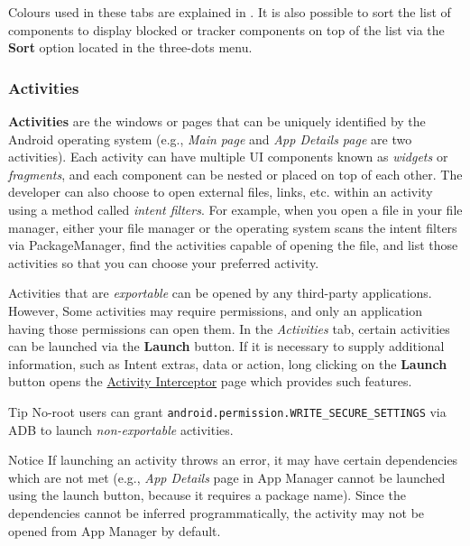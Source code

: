 Colours used in these tabs are explained in . It is also
possible to sort the list of components to display blocked or tracker components on top of the list
via the \textbf{Sort} option located in the three-dots menu.

\subsubsection{Activities}\label{subsubsec:activities} %
\textbf{Activities} are the windows or pages that can be uniquely identified by the Android operating system (e.g.,
\textit{Main page} and \textit{App Details page} are two activities). Each activity can have multiple UI components
known as \textit{widgets} or \textit{fragments}, and each component can be nested or placed on top of each other. The
developer can also choose to open external files, links, etc. within an activity using a method called
\textit{intent filters}. For example, when you open a file in your file manager, either your file manager or the
operating system scans the intent filters via PackageManager, find the activities capable of opening the file, and
list those activities so that you can choose your preferred activity.

Activities that are \textit{exportable} can be opened by any third-party applications. However, Some
activities may require permissions, and only an application having those permissions can open them.
In the \textit{Activities} tab, certain activities can be launched via the \textbf{Launch} button.
If it is necessary to supply additional information, such as Intent extras, data or action, long
clicking on the \textbf{Launch} button opens the \hyperref[sec:interceptor-page]{Activity Interceptor}
page which provides such features.

\begin{tip}{Tip}
    No-root users can grant \texttt{android.permission.WRITE\_SECURE\_SETTINGS} via ADB to launch
    \textit{non-exportable} activities.
\end{tip}

\begin{tip}{Notice}
    If launching an activity throws an error, it may have certain dependencies which are not met
    (e.g., \textit{App Details} page in App Manager cannot be launched using the launch button,
    because it requires a package name). Since the dependencies cannot be inferred programmatically,
    the activity may not be opened from App Manager by default.
\end{tip}

